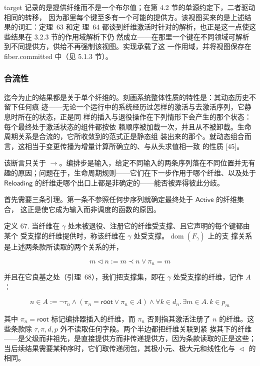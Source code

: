 \documentclass[
  10
]{article}
\begin{document}
target 记录的是提供纤维而不是一个布尔值；在第 4.2 节的单源约定下，二者驱动相同的转移，
因为那里每个键至多有一个可能的提供方。该视图买来的是上述结果的词汇：定理~63 和定
理~64 都谈到纤维激活时针对的解析，也正是这一点使这些结果在 3.2.3 节的作用域解析下仍
然成立——在那里一个键在不同领域可解析到不同提供方，供给不再强制该视图。实现承载了这
一作用域，并将视图保存在 fiber.committed 中（见 5.1.3 节）。

\subsubsection{合流性} \label{confluence}

迄今为止的结果都是关于单个纤维的。刻画系统整体性质的特性是：其动态历史不留下任何痕
迹——无论一个运行中的系统经历过怎样的激活与去激活序列，它静息时所在的状态，正是同
样的插入与退役操作在下列情形下会产生的那个状态：每个最终处于激活状态的组件都按依
赖顺序被加载一次，并且从不被卸载。生命周期关系是合流的，它所收敛到的范式正是静态组
装出来的那个。就动态组合而言，这相当于变更传播为增量计算所确立的、与从头求值相一致
的性质 {[}45{]}。

该断言只关于 \(\longrightarrow\)。编排步是输入，给定不同输入的两条序列落在不同位置并无有
趣的原因；问题在于，生命周期规则——它们在下一步作用于哪个纤维、以及处于
\(\mathsf{Reloading}\) 的纤维走哪个出口上都是非确定的——能否被弄得彼此分歧。

首先需要三条引理。第一条不参照任何步序列就确定最终处于 \(\mathsf{Active}\) 的纤维集合，
这正是使它成为输入而非调度的函数的原因。

定义 67. 当纤维在 \(\gamma\) 处未被退役、注册它的纤维受支撑、且它声明的每个键都由某个
受支撑的纤维提供时，称该纤维在 \(\gamma\) 处受支撑。\(\operatorname{dom}(F_{\gamma})\) 上的支
撑关系是上述两条款所读取的两个关系的并，

\[
m \vartriangleleft n := m \prec n \vee \pi_{n} = m \tag{62}
\]

并且在它良基之处（引理~68），我们把支撑集，即在 \(\gamma\) 处受支撑的纤维，记作 \(A\)：

\[
n \in A := \lnot \tau_{n} \land (\pi_{n} = \mathsf{root} \lor \pi_{n} \in A) \land \forall k \in d_{n}.\, \exists m \in A.\, k \in p_{m} \tag{63}
\]

其中 \(\pi_{n} = \mathsf{root}\) 标记编排器插入的纤维，而 \(\pi_{n}\) 否则指其激活注册了
\(n\) 的纤维。这些条款除 \(\tau, \pi, d, p\) 外不读取任何字段。两个半边都把纤维关联到紧
挨其下的纤维——是父级而非祖先，是直接提供方而非传递提供方，因为条款读取的正是这些；
当后续结果需要某种序时，它们取传递闭包，其极小元、极大元和线性化与
\(\vartriangleleft\) 的相同。
\end{document}
